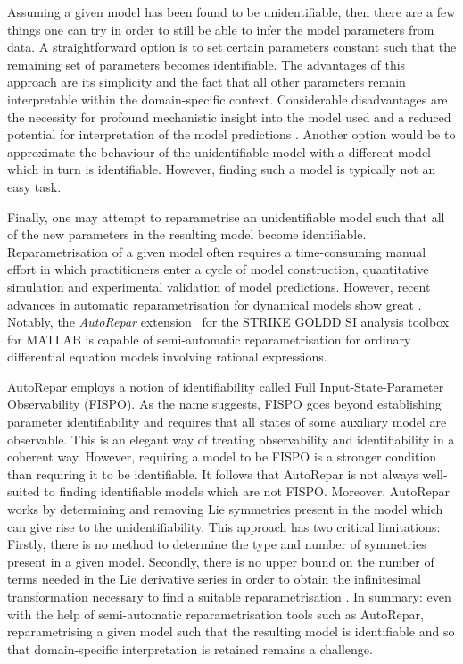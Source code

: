 Assuming a given model has been found to be unidentifiable, then there are a few things one can try in order to still be able to infer the model parameters from data.
A straightforward option is to set certain parameters  constant such that the remaining set of parameters becomes identifiable. 
The advantages of this approach are its simplicity and the fact that all other parameters remain interpretable within the domain-specific context. 
Considerable disadvantages are the necessity for profound mechanistic insight into the model used and a reduced potential for interpretation of the model predictions \cite{WIELAND202160}.
Another option would be to approximate the behaviour of the unidentifiable model with a different model which in turn is identifiable.
However, finding such a model is typically not an easy task.

Finally, one may attempt to reparametrise an unidentifiable model such that all of the new parameters in the resulting model become identifiable. 
Reparametrisation of a given model often requires a time-consuming manual effort in which practitioners enter a cycle of model construction, quantitative simulation and experimental validation of model predictions.
However, recent advances in automatic reparametrisation for dynamical models show great . 
Notably, the \emph{AutoRepar} extension~\cite{massonis2021autorepar} for the STRIKE GOLDD SI analysis toolbox~\cite{villaverde2016structural} for MATLAB is capable of semi-automatic reparametrisation for ordinary differential equation models involving rational expressions. 

AutoRepar employs a notion of identifiability called Full Input-State-Parameter Observability (FISPO).
As the name suggests, FISPO goes beyond establishing parameter identifiability and requires that all states of some auxiliary model are observable.
This is an elegant way of treating observability and identifiability in a coherent way.
However, requiring a model to be FISPO is a stronger condition than requiring it to be identifiable.
It follows that AutoRepar is not always well-suited to finding identifiable models which are not FISPO.
Moreover, AutoRepar works by determining and removing Lie symmetries present in the model which can give rise to the unidentifiability.
This approach has two critical limitations:
Firstly, there is no method to determine the type and number of symmetries present in a given model.
Secondly, there is no upper bound on the number of terms needed in the Lie derivative series in order to obtain the infinitesimal transformation necessary to find a suitable reparametrisation \cite{massonis2020}.
In summary: even with the help of semi-automatic reparametrisation tools such as AutoRepar, reparametrising a given model such that the resulting model is identifiable and so that domain-specific interpretation is retained remains a challenge. 

